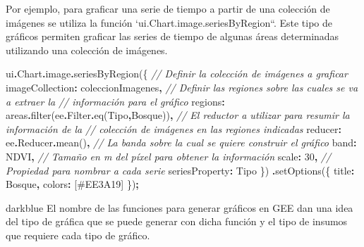 \documentclass[
  12pt,
  letterpaper,
  twoside]{book}
\newenvironment{Shaded}{\begin{snugshade}}{\end{snugshade}}
\newcommand{\AttributeTok}[1]{\textcolor[rgb]{0.77,0.63,0.00}{#1}}
\newcommand{\CommentTok}[1]{\textcolor[rgb]{0.56,0.35,0.01}{\textit{#1}}}
\newcommand{\DataTypeTok}[1]{\textcolor[rgb]{0.13,0.29,0.53}{#1}}
\newcommand{\DecValTok}[1]{\textcolor[rgb]{0.00,0.00,0.81}{#1}}
\newcommand{\FunctionTok}[1]{\textcolor[rgb]{0.00,0.00,0.00}{#1}}
\newcommand{\NormalTok}[1]{#1}
\newcommand{\OperatorTok}[1]{\textcolor[rgb]{0.81,0.36,0.00}{\textbf{#1}}}
\newcommand{\StringTok}[1]{\textcolor[rgb]{0.31,0.60,0.02}{#1}}
\begin{document}
Por ejemplo, para graficar una serie de tiempo a partir de una colección de imágenes se utiliza la función `ui.Chart.image.seriesByRegion``. Este tipo de gráficos permiten graficar las series de tiempo de algunas áreas determinadas utilizando una colección de imágenes.

\begin{Shaded}
\begin{Highlighting}[]
\NormalTok{ui}\OperatorTok{.}\AttributeTok{Chart}\OperatorTok{.}\AttributeTok{image}\OperatorTok{.}\FunctionTok{seriesByRegion}\NormalTok{(\{}
  \CommentTok{// Definir la colección de imágenes a graficar}
  \DataTypeTok{imageCollection}\OperatorTok{:}\NormalTok{ coleccionImagenes}\OperatorTok{,} 
  \CommentTok{// Definir las regiones sobre las cuales se va a extraer la}
  \CommentTok{// información para el gráfico}
  \DataTypeTok{regions}\OperatorTok{:}\NormalTok{ areas}\OperatorTok{.}\FunctionTok{filter}\NormalTok{(ee}\OperatorTok{.}\AttributeTok{Filter}\OperatorTok{.}\FunctionTok{eq}\NormalTok{(}\StringTok{\textquotesingle{}Tipo\textquotesingle{}}\OperatorTok{,}\StringTok{\textquotesingle{}Bosque\textquotesingle{}}\NormalTok{))}\OperatorTok{,}
  \CommentTok{// El reductor a utilizar para resumir la información de la}
  \CommentTok{// colección de imágenes en las regiones indicadas}
  \DataTypeTok{reducer}\OperatorTok{:}\NormalTok{ ee}\OperatorTok{.}\AttributeTok{Reducer}\OperatorTok{.}\FunctionTok{mean}\NormalTok{()}\OperatorTok{,} 
  \CommentTok{// La banda sobre la cual se quiere construir el gráfico}
  \DataTypeTok{band}\OperatorTok{:} \StringTok{\textquotesingle{}NDVI\textquotesingle{}}\OperatorTok{,} 
  \CommentTok{// Tamaño en m del píxel para obtener la información}
  \DataTypeTok{scale}\OperatorTok{:} \DecValTok{30}\OperatorTok{,} 
  \CommentTok{// Propiedad para nombrar a cada serie}
  \DataTypeTok{seriesProperty}\OperatorTok{:} \StringTok{\textquotesingle{}Tipo\textquotesingle{}}
\NormalTok{\})}
  \OperatorTok{.}\FunctionTok{setOptions}\NormalTok{(\{}
    \DataTypeTok{title}\OperatorTok{:} \StringTok{\textquotesingle{}Bosque\textquotesingle{}}\OperatorTok{,}
    \DataTypeTok{colors}\OperatorTok{:}\NormalTok{ [}\StringTok{\textquotesingle{}\#EE3A19\textquotesingle{}}\NormalTok{]}
\NormalTok{  \})}\OperatorTok{;}
\end{Highlighting}
\end{Shaded}

\begin{bluebox2}

\begin{awesomeblock}{5pt}{\faLightbulb}{darkblue}
El nombre de las funciones para generar gráficos en GEE dan una idea del tipo de gráfica que se puede generar con dicha función y el tipo de insumos que requiere cada tipo de gráfico.

\end{awesomeblock}

\end{bluebox2}
\end{document}
